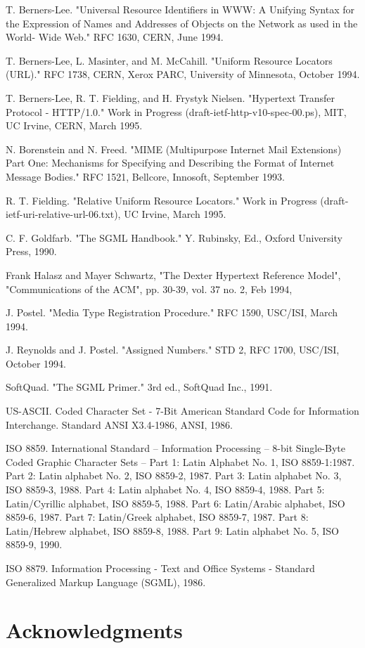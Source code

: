 \begin{description}
T.  Berners-Lee.  "Universal Resource Identifiers in WWW:  A
Unifying Syntax for the Expression of Names and Addresses of Objects
on the Network as used in the World- Wide Web." RFC 1630, CERN, June 1994.
\item[{\it [URL]}]
T.  Berners-Lee, L.  Masinter, and M.  McCahill.  "Uniform
Resource Locators (URL)." RFC 1738, CERN,
Xerox PARC, University of Minnesota, October 1994.
\item[{\it [HTTP]}]
T.  Berners-Lee, R.  T.  Fielding, and H.  Frystyk
Nielsen.  "Hypertext Transfer Protocol - HTTP/1.0." Work in Progress
(draft-ietf-http-v10-spec-00.ps), MIT,
UC Irvine, CERN, March 1995.
\item[{\it [MIME]}]
N.  Borenstein and N.  Freed.  "MIME (Multipurpose Internet
Mail Extensions) Part One:  Mechanisms for Specifying and Describing
the Format of Internet Message Bodies." RFC
1521, Bellcore, Innosoft, September 1993.
\item[{\it [RELURL]}]
R.  T.  Fielding.  "Relative Uniform Resource Locators."
Work in Progress (draft-ietf-uri-relative-url-06.txt), UC Irvine, March 1995.
\item[{\it [GOLD90]}]
C.  F.  Goldfarb.  "The SGML Handbook." Y.  Rubinsky, Ed.,
Oxford University Press, 1990.
\item[{\it [DEXTER]}]
Frank Halasz and Mayer Schwartz, "The Dexter Hypertext
Reference Model", "Communications of the ACM", pp.  30-39, vol.  37
no.  2, Feb 1994,
\item[{\it [IMEDIA]}]
J.  Postel.  "Media Type Registration Procedure."
RFC 1590, USC/ISI, March 1994.
\item[{\it [IANA]}]
J.  Reynolds and J.  Postel.  "Assigned Numbers." STD 2,
RFC 1700, USC/ISI, October 1994.
\item[{\it [SQ91]}]
SoftQuad.  "The SGML Primer." 3rd ed., SoftQuad Inc., 1991.
\item[{\it [US-ASCII]}]
US-ASCII.  Coded Character Set - 7-Bit American
Standard Code for Information Interchange.  Standard ANSI X3.4-1986,
ANSI, 1986.
\item[{\it [ISO-8859-1]}]
ISO
8859.  International Standard -- Information Processing -- 8-bit
Single-Byte Coded Graphic Character Sets -- Part 1:  Latin Alphabet
No.  1, ISO 8859-1:1987.  Part 2:  Latin alphabet No.  2, ISO 8859-2,
1987.  Part 3:  Latin alphabet No.  3, ISO 8859-3, 1988.  Part 4:  Latin
alphabet No.  4, ISO 8859-4, 1988.  Part 5:  Latin/Cyrillic alphabet, ISO
8859-5, 1988.  Part 6:  Latin/Arabic alphabet, ISO 8859-6, 1987.  Part 7:
Latin/Greek alphabet, ISO 8859-7, 1987.  Part 8:  Latin/Hebrew alphabet,
ISO 8859-8, 1988.  Part 9:  Latin alphabet No.  5, ISO 8859-9, 1990.
\item[{\it [SGML]}]
ISO 8879.  Information
Processing - Text and Office Systems - Standard Generalized Markup
Language (SGML), 1986.
\end{description}\section*{Acknowledgments}\par 
